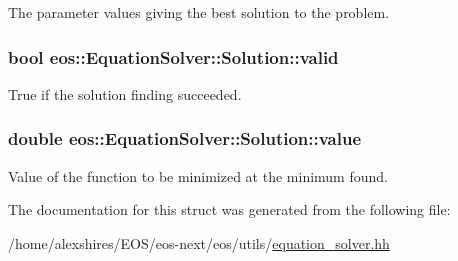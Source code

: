 The parameter values giving the best solution to the problem. \hypertarget{structeos_1_1EquationSolver_1_1Solution_a13f38764efb070fcb3af4fca3db02d1e}{
\subsubsection[{valid}]{\setlength{\rightskip}{0pt plus 5cm}bool {\bf eos::EquationSolver::Solution::valid}}}
\label{structeos_1_1EquationSolver_1_1Solution_a13f38764efb070fcb3af4fca3db02d1e}


True if the solution finding succeeded. \hypertarget{structeos_1_1EquationSolver_1_1Solution_acb4de717f8f570cc92d3f1f2f7c6b085}{
\subsubsection[{value}]{\setlength{\rightskip}{0pt plus 5cm}double {\bf eos::EquationSolver::Solution::value}}}
\label{structeos_1_1EquationSolver_1_1Solution_acb4de717f8f570cc92d3f1f2f7c6b085}


Value of the function to be minimized at the minimum found. 

The documentation for this struct was generated from the following file:\begin{DoxyCompactItemize}
\item 
/home/alexshires/EOS/eos-\/next/eos/utils/\hyperlink{equation__solver_8hh}{equation\_\-solver.hh}\end{DoxyCompactItemize}
